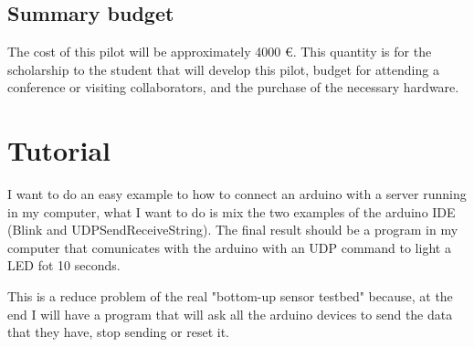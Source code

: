 \documentclass[10pt,a4paper]{article}
\begin{document}
\subsection{Summary budget}
The cost of this pilot will be approximately 4000 €. This quantity is for the scholarship to the student that will develop this pilot, budget for attending a conference or visiting collaborators, and the purchase of the necessary hardware.


\section{Tutorial}
I want to do an easy example to how to connect an arduino with a server running in my computer, what I want to do is mix the two examples of the arduino IDE (Blink and UDPSendReceiveString). The final result should be a program in my computer that comunicates with the arduino with an UDP command to light a LED fot 10 seconds.

This is a reduce problem of the real "bottom-up sensor testbed" because, at the end I will have a program that will ask all the arduino devices to send the data that they have, stop sending or reset it.
\end{document}
